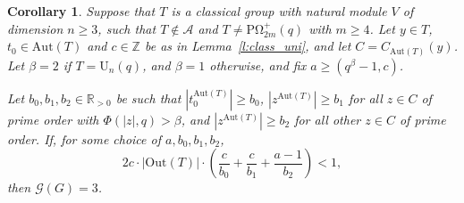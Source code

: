 \documentclass[twoside,a4paper,reqno,11pt]{amsart}
\newcommand{\<}{\langle}
\renewcommand{\>}{\rangle}
\newcommand{\geqs}{\geqslant}
\def\ge{\geqs}
\newcommand{\Aut}{\mathrm{Aut}}
\newcommand{\Out}{\mathrm{Out}}
\newcommand{\PSp}{\mathrm{PSp}}
\newcommand{\POmega}{\mathrm{P\Omega}}
\newcommand{\UU}{\mathrm{U}}
\newcommand{\cmrd}{\textcolor{blue}}
\newtheorem{cor}[thm]{Corollary}
\theoremstyle{definition}
\begin{document}
\begin{cor}\label{cor:q_bound}
     Suppose that $T$ is a classical group with natural module $V$ of dimension $n \geqs 3$,
    such that $T \not\in \mathcal{A}$ and $T \ne \POmega_{2m}^+(q)$ with $m\geqs 4$.  Let $y \in T$, $t_0 \in \Aut(T)$ and $c \in \mathbb{Z}$ be as in Lemma~\ref{l:class_uni}, and let $C = C_{\Aut(T)}(y)$. Let $\beta = 2$ if $T = \UU_n(q)$, and $\beta = 1$ otherwise, and fix $a \ge  (q^\beta-1,c)$. 
    
    Let $b_0, b_1, b_2\in \mathbb{R}_{>0}$ be such that $|t_0^{\Aut(T)}| \ge b_0$, $|z^{\Aut(T)}| \ge b_1$ for all $z \in C$ of prime order with $\Phi(|z|,q) > \beta$, and $|z^{\Aut(T)}| \ge b_2$ for all other $z \in C$ of prime order. %
    If, for some choice of  $a, b_0, b_1, b_2$,
    \begin{equation*}
    2c\cdot |\Out(T)|\cdot \left(\frac{c}{b_0} + \frac{c}{b_1} + \frac{a-1}{b_2}\right) < 1,
    \end{equation*}
    then $\mathcal{G}(G) = 3$.
\end{cor}
\end{document}
